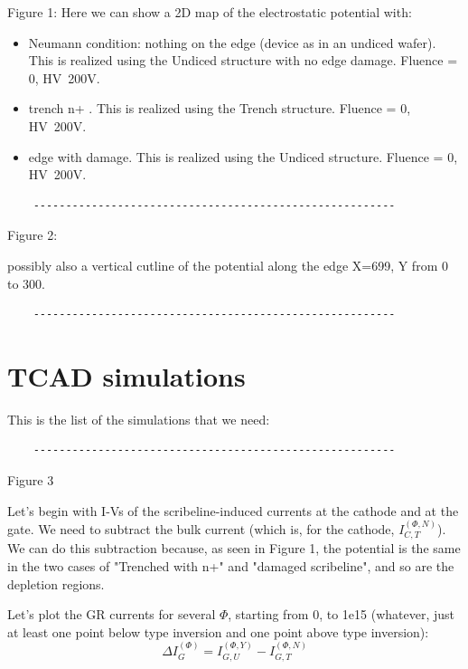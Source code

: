 \documentclass[preprint,12pt]{elsarticle}
\begin{document}
Figure 1:
Here we can show a 2D map of the electrostatic potential with:
\begin{itemize}
\item Neumann condition: nothing on the edge (device as in an undiced wafer). This is realized using the Undiced structure with no edge damage. Fluence = 0, HV~200V.

\item trench n+ . This is 
realized using the Trench structure. Fluence = 0, HV~200V.

\item  edge with damage. This is realized using the Undiced structure. Fluence = 0, HV~200V.


\end{itemize}
\begin{verbatim}
    --------------------------------------------------------
\end{verbatim}

Figure 2:

possibly also a vertical cutline of the potential along the edge X=699, Y from 0 to 300.
\begin{verbatim}
    --------------------------------------------------------
\end{verbatim}






\section{TCAD simulations}
This is the list of the simulations that we need:


\begin{verbatim}
    --------------------------------------------------------
\end{verbatim}


Figure 3


Let's begin with I-Vs of the scribeline-induced currents at the cathode and at the gate.
We need to subtract the bulk current (which is, for the cathode,  $I_{C,T}^{(\Phi,N)}$).
We can do this subtraction because, as seen in Figure 1, the potential is the same in the two cases of "Trenched with n+" and "damaged scribeline", and so are the depletion regions.

Let's plot the GR currents for several $\Phi$, starting from 0, to 1e15 (whatever, just at least one point below type inversion and one point above type inversion):
\begin{equation}
    \Delta I_{G}^{(\Phi)}=I_{G,U}^{(\Phi,Y)}-I_{G,T}^{(\Phi,N)}
    \end{equation}
\end{document}
